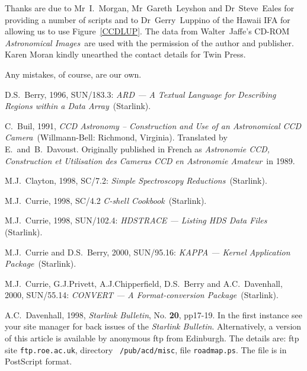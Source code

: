 \documentclass[twoside,11pt]{article}
\newcommand{\htmladdnormallink}[2]{#1}
\newcommand{\xref}[3]{#1}
\begin{document}
Thanks are due to Mr~I.~Morgan, Mr~Gareth~Leyshon and Dr~Steve~Eales for
providing a number of scripts and to Dr~Gerry~Luppino of the Hawaii IFA
for allowing us to use Figure~\ref{CCDLUP}.  The data from Walter~Jaffe's
CD-ROM {\it Astronomical Images}\, are used with the permission of the
author and publisher.  Karen Moran kindly unearthed the contact details
for Twin Press.

Any mistakes, of course, are our own.
  


% 


\newpage
{}
\begin{thebibliography}{99}

   D.S.~Berry, 1996, \xref{SUN/183.3}{sun183}{}: {\it
   ARD --- A Textual Language for Describing Regions within a Data Array}\,
   (Starlink).

   C.~Buil, 1991, {\it CCD Astronomy -- Construction
   and Use of an Astronomical CCD Camera}\, (Willmann-Bell: Richmond,
   Virginia).  Translated by E.~and~B.~Davoust.  Originally published
   in French as {\it Astronomie CCD, Construction et Utilisation des
   Cameras CCD en Astronomie Amateur}\, in 1989.

   M.J.~Clayton, 1998, \xref{SC/7.2}{sc7}{}: {\it Simple
   Spectroscopy Reductions}\, (Starlink).

   M.J.~Currie, 1998, \xref{SC/4.2}{sc4}{} {\it C-shell
   Cookbook}\, (Starlink).

   M.J.~Currie, 1998, \xref{SUN/102.4}{sun102}{}:
   {\it HDSTRACE --- Listing HDS Data Files}\, (Starlink).

   M.J.~Currie and D.S.~Berry, 2000,
   \xref{SUN/95.16}{sun95}{}: {\it KAPPA --- Kernel Application Package}\,
   (Starlink).

   M.J.~Currie, G.J.Privett, A.J.Chipperfield,
   D.S.~Berry and A.C.~Davenhall, 2000, \xref{SUN/55.14}{sun55}{}: {\it
   CONVERT --- A Format-conversion Package}\, (Starlink).

   A.C.~Davenhall, 1998, 
  \htmladdnormallink{{\it Starlink Bulletin}}
   {http://star-www.rl.ac.uk//bulletin.html},
   No. {\bf 20}, pp17-19.  In the first instance see your site manager
   for back issues of the {\it Starlink Bulletin}.  Alternatively, a
   version of this article is available by anonymous ftp from Edinburgh.
   The details are: ftp site {\tt ftp.roe.ac.uk}, directory {\tt
   /pub/acd/misc}, file {\tt roadmap.ps}.  The file is in PostScript
   format.


\end{thebibliography}
\end{document}
